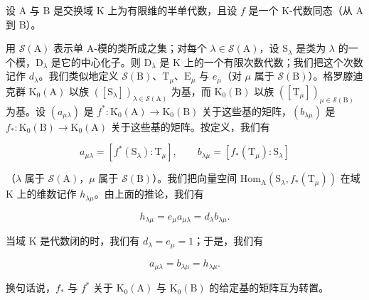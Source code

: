 设 \(\mathrm{A}\) 与 \(\mathrm{B}\) 是交换域 \(\mathrm{K}\) 上为有限维的半单代数，且设 \(f\) 是一个 \(\mathrm{K}\)-代数同态（从 \(\mathrm{A}\) 到 \(\mathrm{B}\)）。

用 \(\mathcal{S}(\mathrm{A})\) 表示单 A-模的类所成之集；对每个 \(\lambda \in \mathcal{S}(\mathrm{A})\)，设 \(\mathrm{S}_{\lambda}\) 是类为 \(\lambda\) 的一个模，\(\mathrm{D}_{\lambda}\) 是它的中心化子。则 \(\mathrm{D}_{\lambda}\) 是 \(\mathrm{K}\) 上的一个有限次数代数；我们把这个次数记作 \(d_{\lambda}\)。我们类似地定义 \(\mathcal{S}(\mathrm{B})\)、\(\mathrm{T}_{\mu}\)、\(\mathrm{E}_{\mu}\) 与 \(e_{\mu}\)（对 \(\mu\) 属于 \(\mathcal{S}(\mathrm{B})\)）。格罗滕迪克群 \(\mathrm{K}_0(\mathrm{A})\) 以族 \(([\mathrm{S}_{\lambda}])_{\lambda \in \mathcal{S}(\mathrm{A})}\) 为基，而 \(\mathrm{K}_0(\mathrm{B})\) 以族 \(([\mathrm{T}_{\mu}])_{\mu \in \mathcal{S}(\mathrm{B})}\) 为基。设 \((a_{\mu \lambda})\) 是 \(f^{*}: \mathrm{K}_{0}(\mathrm{A}) \to \mathrm{K}_{0}(\mathrm{B})\) 关于这些基的矩阵，\((b_{\lambda \mu})\) 是 \(f_{*}: \mathrm{K}_{0}(\mathrm{B}) \to \mathrm{K}_{0}(\mathrm{A})\) 关于这些基的矩阵。按定义，我们有

\[
a _ {\mu \lambda} = [ f ^ {*} (\mathrm{S} _ {\lambda}): \mathrm{T} _ {\mu} ], \qquad b _ {\lambda \mu} = [ f _ {*} (\mathrm{T} _ {\mu}): \mathrm{S} _ {\lambda} ]\tag{23}
\]

（\(\lambda\) 属于 \(\mathcal{S}(\mathrm{A})\)，\(\mu\) 属于 \(\mathcal{S}(\mathrm{B})\)）。我们把向量空间 \(\mathrm{Hom}_{\mathrm{A}}(\mathrm{S}_{\lambda}, f_{*}(\mathrm{T}_{\mu}))\) 在域 K 上的维数记作 \(h_{\lambda \mu}\)。由上面的推论，我们有

\[
h _ {\lambda \mu} = e _ {\mu} a _ {\mu \lambda} = d _ {\lambda} b _ {\lambda \mu}.\tag{24}
\]

当域 K 是代数闭的时，我们有 \(d_{\lambda} = e_{\mu} = 1\)；于是，我们有

\[
a _ {\mu \lambda} = b _ {\lambda \mu} = h _ {\lambda \mu}.\tag{25}
\]

换句话说，\(f_{*}\) 与 \(f^{*}\) 关于 \(\mathrm{K}_0(\mathrm{A})\) 与 \(\mathrm{K}_0(\mathrm{B})\) 的给定基的矩阵互为转置。


